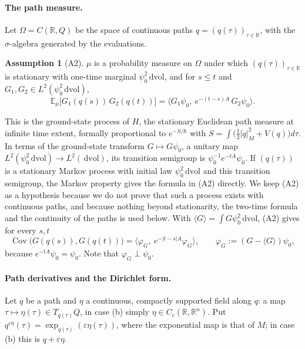 \documentclass[11pt,a4paper]{article}
\theoremstyle{definition}
\newtheorem{assumption}[theorem]{Assumption}
\theoremstyle{remark}
\newcommand{\E}{\mathbb{E}}
\newcommand{\R}{\mathbb{R}}
\newcommand{\Cov}{\operatorname{Cov}}
\newcommand{\dvol}{\,\mathrm{dvol}}
\begin{document}
\paragraph{The path measure.}
Let $\Omega=C(\R,Q)$ be the space of continuous paths $q=(q(\tau))_{\tau\in\R}$, with the $\sigma$-algebra generated by the evaluations.

\begin{assumption}[A2]\label{ass:A2}
$\mu$ is a probability measure on $\Omega$ under which $(q(\tau))_{\tau\in\R}$ is stationary with one-time marginal $\psi_0^2\dvol$, and for $s\le t$ and $G_1,G_2\in L^2(\psi_0^2\dvol)$,
\[
  \E_\mu\bigl[G_1(q(s))\,G_2(q(t))\bigr]=\bigl\langle G_1\psi_0,\ e^{-(t-s)A}\,G_2\psi_0\bigr\rangle .
\]
\end{assumption}

This is the ground-state process of $H$, the stationary Euclidean path measure at infinite time extent, formally proportional to $e^{-S/\hbar}$ with $S=\int\bigl(\tfrac12|\dot q|_M^2+V(q)\bigr)d\tau$.
In terms of the ground-state transform $G\mapsto G\psi_0$, a unitary map $L^2(\psi_0^2\dvol)\to L^2(\dvol)$, its transition semigroup is $\psi_0^{-1}e^{-tA}\psi_0$.
If $(q(\tau))$ is a stationary Markov process with initial law $\psi_0^2\dvol$ and this transition semigroup, the Markov property gives the formula in (A2) directly.
We keep (A2) as a hypothesis because we do not prove that such a process exists with continuous paths, and because nothing beyond stationarity, the two-time formula and the continuity of the paths is used below.
With $\langle G\rangle=\int G\psi_0^2\dvol$, (A2) gives for every $s,t$
\begin{equation}\label{eq:cov}
  \Cov\bigl(G(q(s)),G(q(t))\bigr)=\bigl\langle\varphi_G,\ e^{-|t-s|A}\varphi_G\bigr\rangle,\qquad \varphi_G:=(G-\langle G\rangle)\psi_0 ,
\end{equation}
because $e^{-tA}\psi_0=\psi_0$.
Note that $\varphi_G\perp\psi_0$.

\paragraph{Path derivatives and the Dirichlet form.}
Let $q$ be a path and $\eta$ a continuous, compactly supported field along $q$: a map $\tau\mapsto\eta(\tau)\in T_{q(\tau)}Q$, in case (b) simply $\eta\in C_c(\R,\R^n)$.
Put $q^{\varepsilon\eta}(\tau)=\exp_{q(\tau)}(\varepsilon\eta(\tau))$, where the exponential map is that of $M$; in case (b) this is $q+\varepsilon\eta$.
\end{document}
